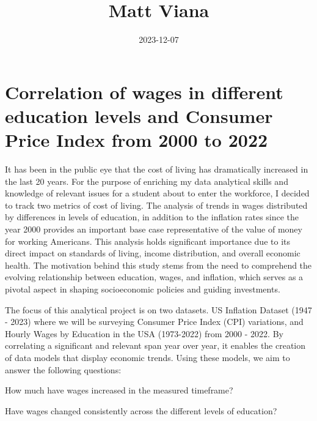 \documentclass[
  letterpaper,
  DIV=11,
  numbers=noendperiod]{scrartcl}
\title{Matt Viana}
\author{}
\date{2023-12-07}
\begin{document}
\maketitle
\ifdefined\Shaded\renewenvironment{Shaded}{\begin{tcolorbox}[boxrule=0pt, frame hidden, interior hidden, sharp corners, enhanced, breakable, borderline west={3pt}{0pt}{shadecolor}]}{\end{tcolorbox}}\fi

\hypertarget{correlation-of-wages-in-different-education-levels-and-consumer-price-index-from-2000-to-2022}{%
\section{Correlation of wages in different education levels and Consumer
Price Index from 2000 to
2022}\label{correlation-of-wages-in-different-education-levels-and-consumer-price-index-from-2000-to-2022}}

It has been in the public eye that the cost of living has dramatically
increased in the last 20 years. For the purpose of enriching my data
analytical skills and knowledge of relevant issues for a student about
to enter the workforce, I decided to track two metrics of cost of
living. The analysis of trends in wages distributed by differences in
levels of education, in addition to the inflation rates since the year
2000 provides an important base case representative of the value of
money for working Americans. This analysis holds significant importance
due to its direct impact on standards of living, income distribution,
and overall economic health. The motivation behind this study stems from
the need to comprehend the evolving relationship between education,
wages, and inflation, which serves as a pivotal aspect in shaping
socioeconomic policies and guiding investments.

The focus of this analytical project is on two datasets. US Inflation
Dataset (1947 - 2023) where we will be surveying Consumer Price Index
(CPI) variations, and Hourly Wages by Education in the USA (1973-2022)
from 2000 - 2022. By correlating a significant and relevant span year
over year, it enables the creation of data models that display economic
trends. Using these models, we aim to answer the following questions:

How much have wages increased in the measured timeframe?

Have wages changed consistently across the different levels of
education?
\end{document}
